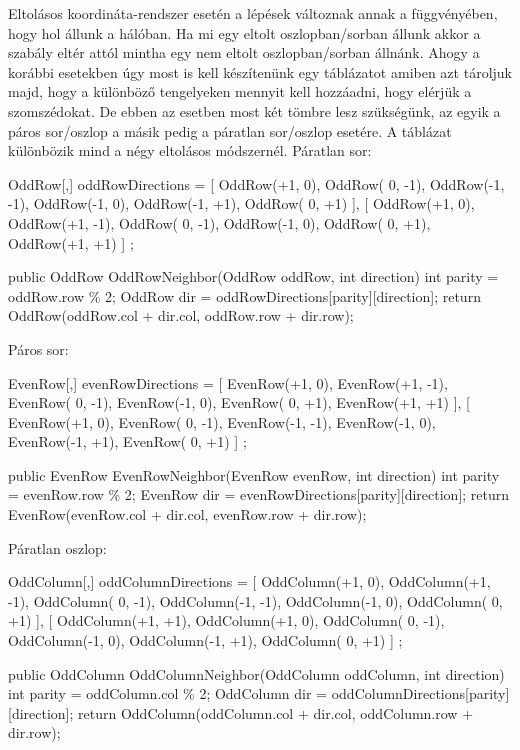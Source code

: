 \noindent Eltolásos koordináta-rendszer esetén a lépések változnak annak a függvényében, hogy hol állunk a hálóban. Ha mi egy eltolt oszlopban/sorban állunk akkor a szabály eltér attól mintha egy nem eltolt oszlopban/sorban állnánk.
\newline
\newline Ahogy a korábbi esetekben úgy most is kell készítenünk egy táblázatot amiben azt tároljuk majd, hogy a különböző tengelyeken mennyit kell hozzáadni, hogy elérjük a szomszédokat. De ebben az esetben most két tömbre lesz szükségünk, az egyik a páros sor/oszlop a másik pedig a páratlan sor/oszlop esetére.
\newline
\newline A táblázat különbözik mind a négy eltolásos módszernél.
\newline
\newline Páratlan sor: 
\begin{cpp}
OddRow[,] oddRowDirections = 
{ 
   [ 
      OddRow(+1,  0), OddRow( 0, -1), OddRow(-1, -1),
      OddRow(-1,  0), OddRow(-1, +1), OddRow( 0, +1) 
   ],
   [ 
      OddRow(+1,  0), OddRow(+1, -1), OddRow( 0, -1),
      OddRow(-1,  0), OddRow( 0, +1), OddRow(+1, +1) 
   ]
};

public OddRow OddRowNeighbor(OddRow oddRow, int direction)
{
   int parity = oddRow.row \% 2;
   OddRow dir = oddRowDirections[parity][direction];
   return OddRow(oddRow.col + dir.col, oddRow.row + dir.row);
}   
\end{cpp}

Páros sor: 
\begin{cpp}  
EvenRow[,] evenRowDirections = 
{ 
   [
      EvenRow(+1,  0), EvenRow(+1, -1), EvenRow( 0, -1),
      EvenRow(-1,  0), EvenRow( 0, +1), EvenRow(+1, +1) 
   ],
   [ 
      EvenRow(+1,  0), EvenRow( 0, -1), EvenRow(-1, -1),
      EvenRow(-1,  0), EvenRow(-1, +1), EvenRow( 0, +1) 
   ]
};

public EvenRow EvenRowNeighbor(EvenRow evenRow, int direction)
{
   int parity = evenRow.row \% 2;
   EvenRow dir = evenRowDirections[parity][direction];
   return EvenRow(evenRow.col + dir.col, evenRow.row + dir.row);
}   
\end{cpp}

Páratlan oszlop: 
\begin{cpp}
OddColumn[,] oddColumnDirections = 
{ 
   [ 
      OddColumn(+1,  0), OddColumn(+1, -1), OddColumn( 0, -1),
      OddColumn(-1, -1), OddColumn(-1,  0), OddColumn( 0, +1) 
   ],
   [ 
      OddColumn(+1, +1), OddColumn(+1,  0), OddColumn( 0, -1),
      OddColumn(-1,  0), OddColumn(-1, +1), OddColumn( 0, +1) 
   ]
};

public OddColumn OddColumnNeighbor(OddColumn oddColumn, int direction)
{
   int parity = oddColumn.col \% 2;
   OddColumn dir = oddColumnDirections[parity][direction];
   return OddColumn(oddColumn.col + dir.col, oddColumn.row + dir.row);
}   
\end{cpp}

